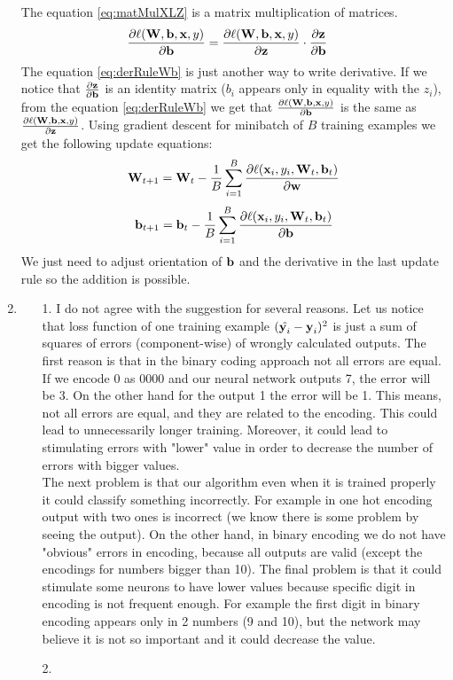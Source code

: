 \documentclass[10pt,a4paper]{article}
\begin{document}
\begin{enumerate}
The equation \ref{eq:matMulXLZ} is a matrix multiplication of matrices. 
\begin{align}
\frac{\partial \ell(\textbf{\text{{W}}}, \textbf{\text{{b}}}, \textbf{\text{{x}}}, y)}{\partial \textbf{\text{{b}}}} &=
\frac{\partial \ell (\textbf{\text{{W}}}, \textbf{\text{{b}}}, \textbf{\text{{x}}}, y)}{\partial \textbf{\text{{z}}}}
\cdot \frac{\partial \textbf{\text{{z}}}}{\partial \textbf{\text{{b}}}} \label{eq:derRuleWb}
\end{align}
The equation \ref{eq:derRuleWb} is just another way to write derivative. 
If we notice that $\frac{\partial \textbf{\text{{z}}}}{\partial \textbf{\text{{b}}}}$ is an identity matrix ($b_i$ appears only in equality with the $z_i$), from the equation \ref{eq:derRuleWb} we get that $\frac{\partial \ell(\textbf{\text{{W}}}, \textbf{\text{{b}}}, \textbf{\text{{x}}}, y)}{\partial \textbf{\text{{b}}}}$ is the same as $\frac{\partial \ell(\textbf{\text{{W}}}, \textbf{\text{{b}}}, \textbf{\text{{x}}}, y)}{\partial \textbf{\text{{z}}}}$.
Using gradient descent for minibatch of $B$ training examples we get the following update equations:
$$\textbf{\text{{W}}}_{t+1} = \textbf{\text{{W}}}_t - \frac{1}{B}\sum_{i=1}^B\frac{\partial \ell(\textbf{\text{{x}}}_i, y_i, \textbf{\text{{W}}}_t, \textbf{\text{{b}}}_t)}{\partial \textbf{\text{{w}}}}$$
$$\textbf{\text{{b}}}_{t+1} = \textbf{\text{{b}}}_t - \frac{1}{B}\sum_{i=1}^B\frac{\partial \ell(\textbf{\text{{x}}}_i, y_i, \textbf{\text{{W}}}_t, \textbf{\text{{b}}}_t)}{\partial \textbf{\text{{b}}}}$$
We just need to adjust orientation of $\textbf{\text{{b}}}$ and the derivative in the last update rule so the addition is possible. 
\item 
\begin{enumerate}
\item [1.]
I do not agree with the suggestion for several reasons. Let us notice that loss function of one training example $(\hat{\textbf{\text{{y}}}_i}-\textbf{\text{{y}}}_i)^2$ is just a sum of squares of errors (component-wise) of wrongly calculated outputs. The first reason is that in the binary coding approach not all errors are equal. If we encode 0 as 0000 and our neural network outputs 7, the error will be 3. On the other hand for the output 1 the error will be 1. This means, not all errors are equal, and they are related to the encoding. This could lead to unnecessarily longer training. Moreover, it could lead to stimulating errors with "lower" value in order to decrease the number of errors with bigger values.\\
The next problem is that our algorithm even when it is trained properly it could classify something incorrectly. For example in one hot encoding output with two ones is incorrect (we know there is some problem by seeing the output). On the other hand, in binary encoding we do not have "obvious" errors in encoding, because all outputs are valid (except the encodings for numbers bigger than 10).
The final problem is that it could stimulate some neurons to have lower values because specific digit in encoding is not frequent enough. For example the first digit in binary encoding appears only in 2 numbers (9 and 10), but the network may believe it is not so important and it could decrease the value. 
\item [2.]


\end{enumerate}
\end{enumerate}
\end{document}

